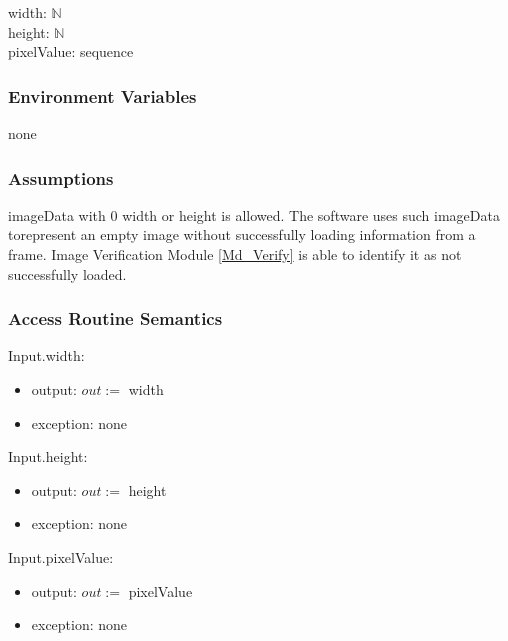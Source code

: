 \documentclass[12pt, titlepage]{article}
\begin{document}
width: $\mathbb{N}$\\
height: $\mathbb{N}$\\
pixelValue: sequence

\subsubsection{Environment Variables}

none

\subsubsection{Assumptions}

imageData with 0 width or height is allowed. The software uses such imageData
torepresent an empty image without successfully loading information from a
frame.
Image Verification Module \ref{Md_Verify} is able to identify it as not
successfully loaded.

\subsubsection{Access Routine Semantics}

\noindent Input.width:
\begin{itemize}
\item output: $out:=$ width 
\item exception: none 
\end{itemize}

\noindent Input.height:
\begin{itemize}
\item output: $out:=$ height 
\item exception: none 
\end{itemize}

\noindent Input.pixelValue: 
\begin{itemize}
\item output: $out:=$ pixelValue 
\item exception: none 
\end{itemize}
\end{document}
